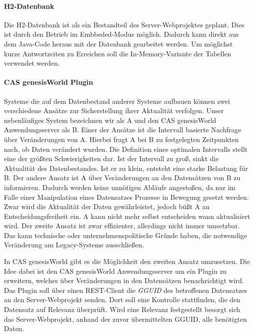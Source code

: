 
\paragraph{H2-Datenbank}

Die H2-Datenbank ist als ein Bestandteil des Server-Webprojektes geplant. Dies ist durch den Betrieb im Embbeded-Modus möglich. Dadurch kann direkt aus dem Java-Code heraus mit der Datenbank gearbeitet werden. Um möglichst kurze Antwortzeiten zu Erreichen soll die In-Memory-Variante der Tabellen verwendet werden.

\paragraph{CAS genesisWorld Plugin} Systeme die auf dem Datenbestand anderer Systeme aufbauen können zwei verschiedene  Ansätze zur Sicherstellung ihrer Aktualität verfolgen. Unser nebenläufiges System bezeichnen wir als A und den CAS genesisWorld Anwendungsserver als B. Einer der Ansätze ist die Intervall basierte Nachfrage über Veränderungen von A. Hierbei fragt A bei B zu festgelegten Zeitpunkten nach, ob Daten verändert wurden. Die Definition eines optimalen Intervalls stellt eine der größten Schwierigkeiten dar. Ist der Intervall zu groß, sinkt die Aktualität des Datenbestandes. Ist er zu klein, entsteht eine starke Belastung für B. Der andere Ansatz ist A über Veränderungen an den Datensätzen von B zu informieren. Dadurch werden keine unnötigen Abläufe angestoßen, da nur im Falle einer Manipulation eines Datensatzes Prozesse in Bewegung gesetzt werden. Zwar wird die Aktualität der Daten gewährleistet, jedoch büßt A an Entscheidungsfreiheit ein. A kann nicht mehr selbst entscheiden wann aktualisiert wird. Der zweite Ansatz ist zwar effizienter, allerdings nicht immer umsetzbar. Das kann technische oder unternehmenspolitische Gründe haben, die notwendige Veränderung am Legacy-Systems ausschließen.  

In CAS genesisWorld gibt es die Möglichkeit den zweiten Ansatz umzusetzen. Die Idee dabei ist den CAS genesisWorld Anwendungsserver um ein Plugin zu erweitern, welches über Veränderungen in den Datensätzen benachrichtigt wird. Das Plugin soll über einen REST-Client die \textit{GGUID} des betroffenen Datensatzes an den Server-Webprojekt senden. Dort soll eine Kontrolle stattfinden, die den Datensatz auf Relevanz überprüft. Wird eine Relevanz festgestellt besorgt sich das Server-Webprojekt, anhand der zuvor übermittelten GGUID, alle benötigten Daten.

